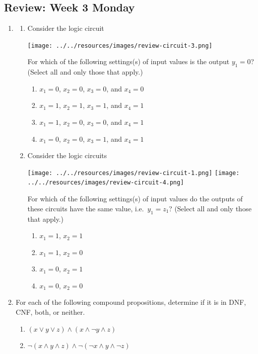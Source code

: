 \documentclass[12pt, oneside]{article}
\begin{document}
\subsection*{Review: Week 3 Monday}
\begin{enumerate}
    \item 

\begin{enumerate}
    \item Consider the logic circuit
    \begin{center}
    \texttt{[image: ../../resources/images/review-circuit-3.png]}
    \end{center}
    For which of the following settings(s) of input values is the output
    $y_1 =  0$? (Select all and only those that apply.)
    \begin{enumerate}
        \item $x_1 = 0$, $x_2 = 0$, $x_3 = 0$, and $x_4 = 0$
        \item $x_1 = 1$, $x_2 = 1$, $x_3 = 1$, and $x_4 = 1$
        \item $x_1 = 1$, $x_2 = 0$, $x_3 = 0$, and $x_4 = 1$
        \item $x_1 = 0$, $x_2 = 0$, $x_3 = 1$, and $x_4 = 1$
    \end{enumerate}
    \item Consider the logic circuits
    \begin{center}
    \texttt{[image: ../../resources/images/review-circuit-1.png]}
    \qquad \qquad \qquad
    \texttt{[image: ../../resources/images/review-circuit-4.png]}
    \end{center}
    For which  of the following settings(s) of input values do the outputs
    of these  circuits have the  same value, i.e.\ $y_1 =  z_1$? 
    (Select all and only those that apply.)
    \begin{enumerate}
        \item $x_1 = 1$, $x_2 = 1$
        \item $x_1 = 1$, $x_2 = 0$
        \item $x_1 = 0$, $x_2 = 1$
        \item $x_1 = 0$, $x_2 = 0$
    \end{enumerate}    
    
\end{enumerate}     \item 

For each of the following compound propositions, determine
if it is in DNF, CNF, both, or neither.

\begin{enumerate}
    \item $(x \lor y \lor z) \land (x \land \lnot y \land z)$
    \item $\lnot (x \land y \land z) \land \lnot (\lnot x \land y \land \lnot z)$
\end{enumerate} \end{enumerate}
\newpage
\end{document}
